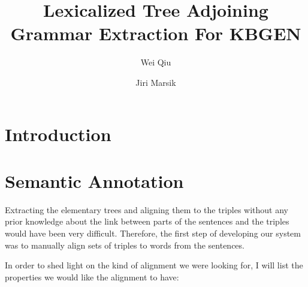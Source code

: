 \documentclass[a4paper]{article}
\title{Lexicalized Tree Adjoining Grammar Extraction For KBGEN}
\author{Wei Qiu \and Jiri Marsik}
\begin{document}
\maketitle
\begin{abstract}
\end{abstract}
\section{Introduction}


\section{Semantic Annotation}
\label{sec:sem-annot}

Extracting the elementary trees and aligning them to the triples
without any prior knowledge about the link between parts of the
sentences and the triples would have been very difficult. Therefore,
the first step of developing our system was to manually align sets of
triples to words from the sentences.

In order to shed light on the kind of alignment we were looking for, I
will list the properties we would like the alignment to have:
\end{document}
